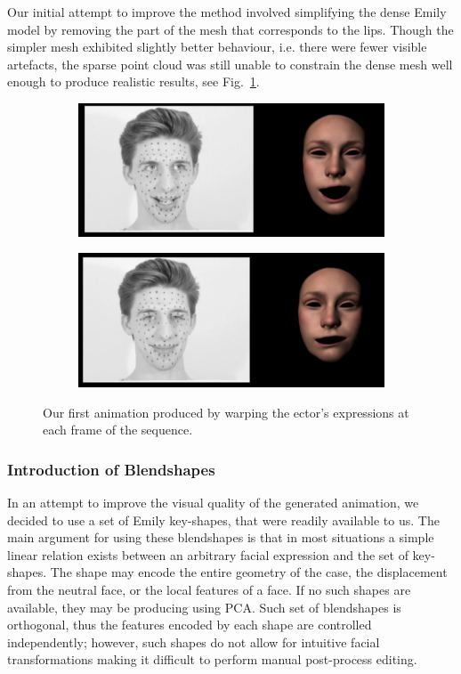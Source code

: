 Our initial attempt to improve the method involved simplifying the dense Emily model by removing the part of the mesh that corresponds to the lips. Though the simpler mesh exhibited slightly better behaviour, i.e. there were fewer visible artefacts, the sparse point cloud was still unable to constrain the dense mesh well enough to produce realistic results, see Fig.~\ref{fig:ghost}. 
\begin{figure}[htbp!]
        \centering
        \begin{subfigure}[b]{0.45\textwidth}
                \includegraphics[width=\textwidth]{img/ghost1.png}
        \end{subfigure}
        \begin{subfigure}[b]{0.45\textwidth}
                \includegraphics[width=\textwidth]{img/ghost2.png}
        \end{subfigure}
        \caption{Our first animation produced by warping the ector's expressions at each frame of the sequence. }\label{fig:ghost}
\end{figure}

\subsubsection{Introduction of Blendshapes}
In an attempt to improve the visual quality of the generated animation, we decided to use a set of Emily key-shapes, that were readily available to us. The main argument for using these blendshapes is that in most situations a simple linear relation exists between an arbitrary facial expression and the set of key-shapes. The shape may encode the entire geometry of the case, the displacement from the neutral face, or the local features of a face. If no such shapes are available, they may be producing using PCA. Such set of blendshapes is orthogonal, thus the features encoded by each shape are controlled independently; however, such shapes do not allow for intuitive facial transformations making it difficult to perform manual post-process editing.

